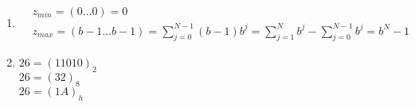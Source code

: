 \begin{enumerate}
	\item \begin{align*}
	&z_{min} = (0\dots0) = 0 \\
	&z_{max} = (b-1\dots b-1) = 
	\sum_{j=0}^{N-1}(b-1)b^j =
		\sum_{j=1}^{N} b^j - \sum_{j=0}^{N-1} b^j  =  b^N - 1 
	\end{align*}
	
	\item $26 = (11010)_2$ \\
	 $26 = (32)_8$\\
	 $26 = (1A)_{h}$
\end{enumerate}